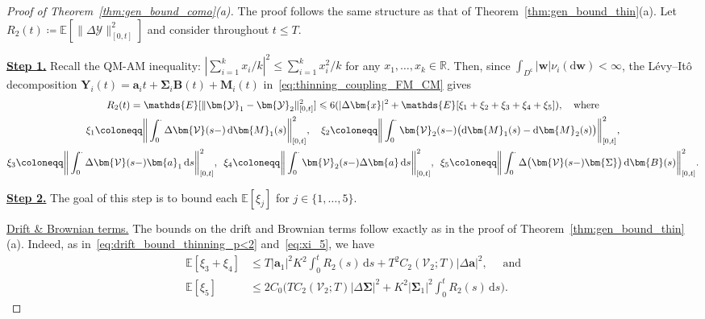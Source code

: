 \documentclass[en,oneside,bbfont,article]{amsart}
\theoremstyle{remark}
\theoremstyle{definition}
\theoremstyle{definition}
\newcommand\Y{\bm{\mathcal{Y}}}
\newcommand{\V}{\bm{\mathcal{V}}}
\newcommand\R{\mathbb{R}}
\newcommand\E{\mathds{E}}
\newcommand\1{\mathds{1}}
\renewcommand\le{\leqslant}
\newcommand\co{\mathsf{c}}
\newcommand{\D}{\mathrm{d}}
\begin{document}
\begin{proof}[Proof of Theorem~\ref{thm:gen_bound_como}(a)]
The proof follows the same structure as that of Theorem~\ref{thm:gen_bound_thin}(a). Let $R_2(t)\coloneqq\E[\|\Delta\Y\|^2_{[0,t]}]$ and consider throughout $t\le T$.

\underline{\textbf{Step 1.}} Recall the QM-AM inequality: $|\sum_{i=1}^k x_i/k|^2 \le \sum_{i=1}^k x_i^2/k$ for any $x_1,\ldots,x_k \in \R$. Then, since $\int_{D^\co}|\bm{w}|\nu_i(\D\bm{w})<\infty$, the L\'evy--It\^o decomposition $\bm{Y}_i(t)=\bm{a}_i t+\bm\Sigma_i\bm{B}(t)+\bm{M}_i(t)$ in~\eqref{eq:thinning_coupling_FM_CM} gives
\begin{gather}
R_2(t)=
\E[\|\Y_1-\Y_2\|_{[0,t]}^2]
\le 
6(|\Delta\bm{x}|^2+\E[\xi_1+\xi_2+\xi_3+\xi_4+\xi_5]),
\quad\text{where}\label{eq:R(T)_gen_bound_CM}
\\ \nonumber
\xi_1 \coloneqq \bigg\|\int_0^\cdot \Delta\V(s-)\,\D \bm{M}_1(s)\bigg\|_{[0,t]}^2,
\quad
\xi_2\coloneqq \bigg\|\int_0^\cdot \V_2(s-)\big(\D \bm{M}_1(s)-\D \bm{M}_2(s)\big)\bigg\|_{[0,t]}^2, 
\\ \nonumber
\xi_3 \coloneqq \bigg\|\int_0^\cdot \Delta\V(s-)\bm{a}_1\,\D s\bigg\|_{[0,t]}^2, 
\enskip
\xi_4 \coloneqq \bigg\|\int_0^\cdot \V_2(s-)\Delta\bm{a}\,\D s\bigg\|_{[0,t]}^2,
\enskip
\xi_5\coloneqq
\bigg\|\int_0^\cdot \Delta\big(\V(s-)\bm{\Sigma}\big)\,\D \bm{B}(s)\bigg\|_{[0,t]}^2.
\end{gather}

\underline{\textbf{Step 2.}}
The goal of this step is to bound each $\E[\xi_j]$ for $j\in\{1,\ldots,5\}$. 


{\underline{Drift \& Brownian terms.}} The bounds on the drift and Brownian terms follow exactly as in the proof of Theorem~\ref{thm:gen_bound_thin}(a). Indeed, as in~\eqref{eq:drift_bound_thinning_p<2} and~\eqref{eq:xi_5}, we have 
\begin{equation}
\label{eq:drift_bound_thinning_p<2_CM}
\begin{split}
\E[\xi_{3}+\xi_{4}] 
&\le 
T|\bm{a}_1|^2K^2 \int_0^t R_2(s)\,\D s
+ T^2 C_2(\V_2;T) |\Delta\bm{a}|^2, 
\quad \text{ and} \\
\E[\xi_5] 
&\le 2C_0 \bigg(TC_2(\V_2;T)|\Delta\bm\Sigma|^2 
+ K^2|\bm\Sigma_1|^2 \int_0^t R_2(s)\,\D s\bigg).
\end{split}
\end{equation}


\end{proof}
\end{document}
